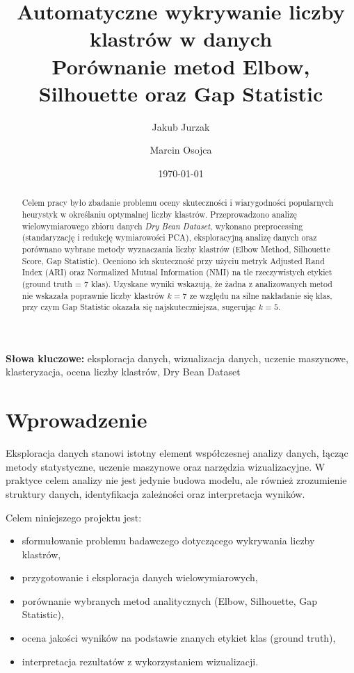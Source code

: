 \documentclass[11pt,a4paper]{article}
\title{\textbf{Automatyczne wykrywanie liczby klastrów w danych}\\
\large Porównanie metod Elbow, Silhouette oraz Gap Statistic}
\author[1]{Jakub Jurzak}
\author[1]{Marcin Osojca}
\affil[1]{Informatyka mgr. dzienne 3 sem. / Eksploracja i Wizualizacja Danych}
\date{\today}
\begin{document}

\maketitle

\begin{abstract}
Celem pracy było zbadanie problemu oceny skuteczności i wiarygodności popularnych heurystyk w określaniu optymalnej liczby klastrów. 
Przeprowadzono analizę wielowymiarowego zbioru danych \textit{Dry Bean Dataset}, wykonano preprocessing (standaryzację i redukcję wymiarowości PCA), eksploracyjną analizę danych oraz porównano wybrane metody wyznaczania liczby klastrów (Elbow Method, Silhouette Score, Gap Statistic). Oceniono ich skuteczność przy użyciu metryk Adjusted Rand Index (ARI) oraz Normalized Mutual Information (NMI) na tle rzeczywistych etykiet (ground truth = 7 klas).
Uzyskane wyniki wskazują, że żadna z analizowanych metod nie wskazała poprawnie liczby klastrów $k=7$ ze względu na silne nakładanie się klas, przy czym Gap Statistic okazała się najskuteczniejsza, sugerując $k=5$.
\end{abstract}

\textbf{Słowa kluczowe:} eksploracja danych, wizualizacja danych, uczenie maszynowe, klasteryzacja, ocena liczby klastrów, Dry Bean Dataset

\section{Wprowadzenie}

Eksploracja danych stanowi istotny element współczesnej analizy danych, łącząc metody statystyczne, uczenie maszynowe oraz narzędzia wizualizacyjne. 
W praktyce celem analizy nie jest jedynie budowa modelu, ale również zrozumienie struktury danych, identyfikacja zależności oraz interpretacja wyników.

Celem niniejszego projektu jest:
\begin{itemize}[leftmargin=1.5cm]
    \item sformułowanie problemu badawczego dotyczącego wykrywania liczby klastrów,
    \item przygotowanie i eksploracja danych wielowymiarowych,
    \item porównanie wybranych metod analitycznych (Elbow, Silhouette, Gap Statistic),
    \item ocena jakości wyników na podstawie znanych etykiet klas (ground truth),
    \item interpretacja rezultatów z wykorzystaniem wizualizacji.
\end{itemize}
\end{document}
